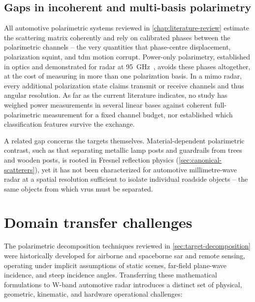\subsection{Gaps in incoherent and multi-basis polarimetry}
\label{sec:gaps-incoherent}

All automotive polarimetric systems reviewed in \cref{chap:literature-review} estimate the scattering matrix coherently and rely on calibrated phases between the polarimetric channels -- the very quantities that phase-centre displacement, polarization squint, and \gls{tdm} motion corrupt.
Power-only polarimetry, established in optics and demonstrated for radar at \qty{95}{GHz}~\parencite{meadComparisonCoherentNoncoherent1996}, avoids these phases altogether, at the cost of measuring in more than one polarization basis.
In a \gls{mimo} radar, every additional polarization state claims transmit or receive channels and thus angular resolution.
As far as the current literature indicates, no study has weighed power measurements in several linear bases against coherent full-polarimetric measurement for a fixed channel budget, nor established which classification features survive the exchange.

A related gap concerns the targets themselves.
Material-dependent polarimetric contrast, such as that separating metallic lamp posts and guardrails from trees and wooden posts, is rooted in Fresnel reflection physics (\cref{sec:canonical-scatterers}), yet it has not been characterized for automotive millimetre-wave radar at a spatial resolution sufficient to isolate individual roadside objects -- the same objects from which \glspl{vru} must be separated.


\section{Domain transfer challenges}
\label{sec:domain-transfer}

The polarimetric decomposition techniques reviewed in \cref{sec:target-decomposition} were historically developed for airborne and spaceborne \gls{sar} and remote sensing, operating under implicit assumptions of static scenes, far-field plane-wave incidence, and steep incidence angles.
Transferring these mathematical formulations to W-band automotive radar introduces a distinct set of physical, geometric, kinematic, and hardware operational challenges:

